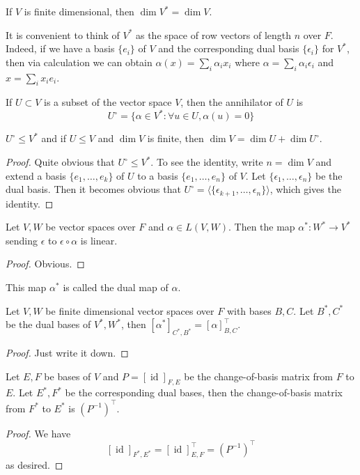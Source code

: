 \begin{corollary}
    If $V$ is finite dimensional, then $\dim V^\ast=\dim V$.
\end{corollary}
\begin{remark}
    It is convenient to think of $V^\ast$ as the space of row vectors of length $n$ over $F$.
    Indeed, if we have a basis $\{e_i\}$ of $V$ and the corresponding dual basis $\{\epsilon_i\}$ for $V^\ast$, then via calculation we can obtain $\alpha(x)=\sum_i\alpha_ix_i$ where $\alpha=\sum_i\alpha_i\epsilon_i$ and $x=\sum_ix_ie_i$.
\end{remark}
\begin{definition}
    If $U\subset V$ is a subset of the vector space $V$, then the annihilator of $U$ is
    $$U^\circ=\{\alpha\in V^\ast:\forall u\in U,\alpha(u)=0\}$$
\end{definition}
\begin{lemma}
    $U^\circ\le V^\ast$ and if $U\le V$ and $\dim V$ is finite, then $\dim V=\dim U+\dim U^\circ$.
\end{lemma}
\begin{proof}
    Quite obvious that $U^\circ\le V^\ast$.
    To see the identity, write $n=\dim V$ and extend a basis $\{e_1,\ldots,e_k\}$ of $U$ to a basis $\{e_1,\ldots,e_n\}$ of $V$.
    Let $\{\epsilon_1,\ldots,\epsilon_n\}$ be the dual basis.
    Then it becomes obvious that $U^\circ=\langle\{\epsilon_{k+1},\ldots,\epsilon_n\}\rangle$, which gives the identity.
\end{proof}
\begin{lemma}
    Let $V,W$ be vector spaces over $F$ and $\alpha\in L(V,W)$.
    Then the map $\alpha^\ast:W^\ast\to V^\ast$ sending $\epsilon$ to $\epsilon\circ\alpha$ is linear.
\end{lemma}
\begin{proof}
    Obvious.
\end{proof}
\begin{definition}
    This map $\alpha^\ast$ is called the dual map of $\alpha$.
\end{definition}
\begin{proposition}
    Let $V,W$ be finite dimensional vector spaces over $F$ with bases $B,C$.
    Let $B^\ast,C^\ast$ be the dual bases of $V^\ast,W^\ast$, then $[\alpha^\ast]_{C^\ast,B^\ast}=[\alpha]_{B,C}^\top$.
\end{proposition}
\begin{proof}
    Just write it down.
\end{proof}
\begin{lemma}
    Let $E,F$ be bases of $V$ and $P=[\operatorname{id}]_{F,E}$ be the change-of-basis matrix from $F$ to $E$.
    Let $E^\ast,F^\ast$ be the corresponding dual bases, then the change-of-basis matrix from $F^\ast$ to $E^\ast$ is $(P^{-1})^\top$.
\end{lemma}
\begin{proof}
    We have
    $$[\operatorname{id}]_{F^\ast,E^\ast}=[\operatorname{id}]^\top_{E,F}=(P^{-1})^\top$$
    as desired.
\end{proof}